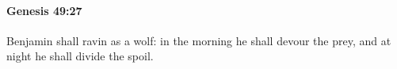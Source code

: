 
		\paragraph{Genesis 49:27} %
			\label{GENESIS-49-27}

			Benjamin shall ravin as a wolf: in the morning he shall devour the prey, and at night he shall divide the spoil.


